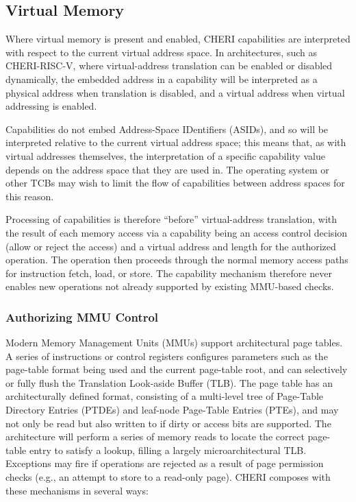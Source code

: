 \subsection{Virtual Memory}
\label{sec:virtual_memory}

Where virtual memory is present and enabled, CHERI capabilities are
interpreted with respect to the current virtual address space.
In architectures, such as CHERI-RISC-V, where virtual-address translation can be
enabled or disabled dynamically, the embedded address in a capability will be interpreted as a
physical address when translation is disabled, and a virtual address when
virtual addressing is enabled.

Capabilities do not embed Address-Space IDentifiers (ASIDs), and so will be
interpreted relative to the current virtual address space; this means that,
as with virtual addresses themselves, the interpretation of a specific
capability value depends on the address space that they are used in.
The operating system or other TCBs may wish to limit the flow of capabilities
between address spaces for this reason.

Processing of capabilities is therefore ``before'' virtual-address
translation, with the result of each memory access via a capability being an
access control decision (allow or reject the access) and a virtual address and
length for the authorized operation.
The operation then proceeds through the normal memory access paths for
instruction fetch, load, or store.
The capability mechanism therefore never enables new operations not already
supported by existing MMU-based checks.

\subsubsection{Authorizing MMU Control}

Modern Memory Management Units (MMUs) support architectural page tables.
A series of instructions or control registers
configures parameters such as the page-table format being used and the current
page-table root, and can selectively or fully flush the Translation
Look-aside Buffer (TLB).
The page table has an architecturally defined format, consisting of a
multi-level tree of Page-Table Directory Entries (PTDEs) and leaf-node
Page-Table Entries (PTEs), and may not only be read but also written to if
dirty or access bits are supported.
The architecture will perform a series of memory reads to locate the correct
page-table entry to satisfy a lookup, filling a largely microarchitectural
TLB.
Exceptions may fire if operations are rejected as a result of
page permission checks (e.g., an attempt to store to a read-only page).
CHERI composes with these mechanisms in several ways:


